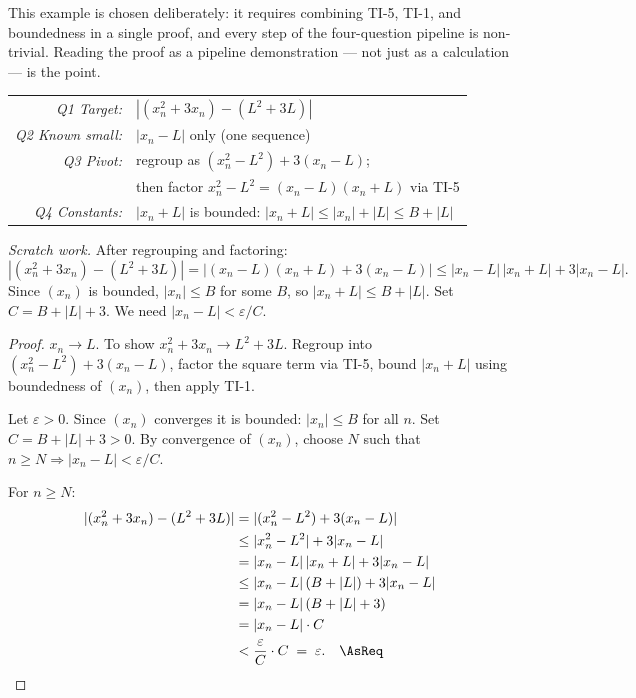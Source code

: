 \medskip

\noindent This example is chosen deliberately: it requires combining
TI-5, TI-1, and boundedness in a single proof, and every step of the
four-question pipeline is non-trivial.
Reading the proof as a pipeline demonstration — not just as a
calculation — is the point.

\begin{center}
\renewcommand{\arraystretch}{1.3}
\begin{tabular}{r l}
\toprule
\textit{Q1 Target:} & $|(x_n^2 + 3x_n) - (L^2 + 3L)|$ \\
\textit{Q2 Known small:} & $|x_n - L|$ only (one sequence) \\
\textit{Q3 Pivot:} & regroup as $(x_n^2 - L^2) + 3(x_n - L)$; \\
                   & then factor $x_n^2 - L^2 = (x_n - L)(x_n + L)$ via TI-5 \\
\textit{Q4 Constants:} & $|x_n + L|$ is bounded: $|x_n + L| \le |x_n| + |L| \le B + |L|$ \\
\bottomrule
\end{tabular}
\end{center}

\textit{Scratch work.}
After regrouping and factoring:
\[
  |(x_n^2 + 3x_n) - (L^2 + 3L)|
  = |(x_n - L)(x_n + L) + 3(x_n - L)|
  \le |x_n - L|\,|x_n + L| + 3|x_n - L|.
\]
Since $(x_n)$ is bounded, $|x_n| \le B$ for some $B$, so
$|x_n + L| \le B + |L|$.
Set $C = B + |L| + 3$.
We need $|x_n - L| < \varepsilon / C$.

\begin{proof}
\Given $x_n \to L$.
\Goal To show $x_n^2 + 3x_n \to L^2 + 3L$.
\Strategy Regroup into $(x_n^2 - L^2) + 3(x_n - L)$, factor the
square term via TI-5, bound $|x_n + L|$ using boundedness of $(x_n)$,
then apply TI-1.

Let $\varepsilon > 0$.
Since $(x_n)$ converges it is bounded: $|x_n| \le B$ for all $n$.
Set $C = B + |L| + 3 > 0$.
By convergence of $(x_n)$, choose $N$ such that
$n \ge N \Rightarrow |x_n - L| < \varepsilon / C$.

For $n \ge N$:
\begin{align*}
  |(x_n^2 + 3x_n) - (L^2 + 3L)|
  &= |(x_n^2 - L^2) + 3(x_n - L)| \\
  &\le |x_n^2 - L^2| + 3|x_n - L| \\
  &= |x_n - L|\,|x_n + L| + 3|x_n - L| \\
  &\le |x_n - L|\,(B + |L|) + 3|x_n - L| \\
  &= |x_n - L|\,(B + |L| + 3) \\
  &= |x_n - L| \cdot C \\
  &< \frac{\varepsilon}{C} \cdot C \;=\; \varepsilon. \quad\AsReq
\end{align*}
\end{proof}

